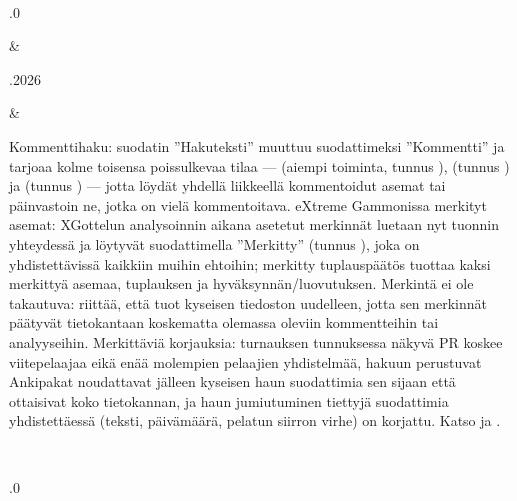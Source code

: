 \documentclass[letterpaper,10pt,finnish]{sphinxmanual}
\begin{document}
\begin{savenotes}
\begin{longtable}{}
\begin{varwidth}[t]{}
\sphinxbeforeendvarwidth
\end{varwidth}%
\\
\sphinxhline\begin{varwidth}[t]{}
.0
\sphinxbeforeendvarwidth
\end{varwidth}%
&\begin{varwidth}[t]{}
.2026
\sphinxbeforeendvarwidth
\end{varwidth}%
&\begin{varwidth}[t]{}
\sphinxAtStartPar
Kommenttihaku: suodatin ”Hakuteksti” muuttuu suodattimeksi ”Kommentti” ja tarjoaa kolme toisensa poissulkevaa tilaa —  (aiempi toiminta, tunnus ),  (tunnus ) ja  (tunnus ) — jotta löydät yhdellä liikkeellä kommentoidut asemat tai päinvastoin ne, jotka on vielä kommentoitava. eXtreme Gammonissa merkityt asemat: XG\sphinxhyphen{}ottelun analysoinnin aikana asetetut merkinnät luetaan nyt tuonnin yhteydessä ja löytyvät suodattimella ”Merkitty” (tunnus ), joka on yhdistettävissä kaikkiin muihin ehtoihin; merkitty tuplauspäätös tuottaa kaksi merkittyä asemaa, tuplauksen ja hyväksynnän/luovutuksen. Merkintä ei ole takautuva: riittää, että tuot kyseisen \sphinxhyphen{}tiedoston uudelleen, jotta sen merkinnät päätyvät tietokantaan koskematta olemassa oleviin kommentteihin tai analyyseihin. Merkittäviä korjauksia: turnauksen tunnuksessa näkyvä PR koskee viitepelaajaa eikä enää molempien pelaajien yhdistelmää, hakuun perustuvat Anki\sphinxhyphen{}pakat noudattavat jälleen kyseisen haun suodattimia sen sijaan että ottaisivat koko tietokannan, ja haun jumiutuminen tiettyjä suodattimia yhdistettäessä (teksti, päivämäärä, pelatun siirron virhe) on korjattu. Katso {\hyperref[\detokenize{cmd_mode:cmd-mode}]{}} ja {\hyperref[\detokenize{manuel:manuel}]{}}.
\sphinxbeforeendvarwidth
\end{varwidth}%
\\
\sphinxhline\begin{varwidth}[t]{}
.0
\sphinxbeforeendvarwidth
\end{varwidth}%

\end{longtable}
\end{savenotes}
\end{document}
